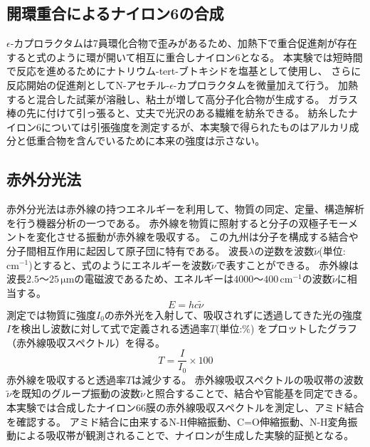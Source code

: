 \documentclass[11pt]{jsarticle}
\begin{document}
\subsection{開環重合によるナイロン6の合成}
$\epsilon$-カプロラクタムは7員環化合物で歪みがあるため、加熱下で重合促進剤が存在すると式のように環が開いて相互に重合しナイロン6となる。
本実験では短時間で反応を進めるためにナトリウム-tert-ブトキシドを塩基として使用し、
さらに反応開始の促進剤としてN-アセチル-$\epsilon$-カプロラクタムを微量加えて行う。
加熱すると混合した試薬が溶融し、粘土が増して高分子化合物が生成する。
ガラス棒の先に付けて引っ張ると、丈夫で光沢のある繊維を紡糸できる。
紡糸したナイロン6については引張強度を測定するが、本実験で得られたものはアルカリ成分と低重合物を含んでいるために本来の強度は示さない。
\subsection{赤外分光法}
赤外分光法は赤外線の持つエネルギーを利用して、物質の同定、定量、構造解析を行う機器分析の一つである。
赤外線を物質に照射すると分子の双極子モーメントを変化させる振動が赤外線を吸収する。
この九州は分子を構成する結合や分子間相互作用に起因して原子団に特有である。
波長$\lambda$の逆数を波数$\tilde{\nu}$(単位:$\mathrm{cm^{-1}}$)とすると、式のようにエネルギーを波数$\tilde{\nu}$で表すことができる。
赤外線は波長$2.5～25\,\mathrm{\mu m}$の電磁波であるため、エネルギーは$4000～400\,\mathrm{cm^{-1}}$の波数$\tilde{\nu}$に相当する。
\begin{equation}
    E=hc\tilde{\nu}
\end{equation}
測定では物質に強度$I_0$の赤外光を入射して、吸収されずに透過してきた光の強度$I$を検出し波数に対して式で定義される透過率$T$(単位:$\mathrm{\%}$)
をプロットしたグラフ（赤外線吸収スペクトル）を得る。
\begin{equation}
    T=\frac{I}{I_0} \times 100
\end{equation}
赤外線を吸収すると透過率$T$は減少する。
赤外線吸収スペクトルの吸収帯の波数$\tilde{\nu}$を既知のグループ振動の波数$\tilde{\nu}$と照合することで、結合や官能基を同定できる。
本実験では合成したナイロン66膜の赤外線吸収スペクトルを測定し、アミド結合を確認する。
アミド結合に由来するN-H伸縮振動、C=O伸縮振動、N-H変角振動による吸収帯が観測されることで、ナイロンが生成した実験的証拠となる。
\end{document}
